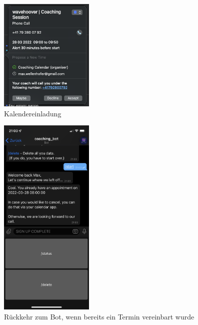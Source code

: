 	\begin{figure}
		\centering
		\includegraphics[width=0.4\textwidth]{images/Screenshots/calendar-invite.png}
		\caption{Kalendereinladung}
		\label{fig: scs..calendar-invite}
	\end{figure}


	\begin{figure}
		\centering
		\includegraphics[width=0.4\textwidth]{images/Screenshots/return-with-appointment.PNG}
		\caption{Rückkehr zum Bot, wenn bereits ein Termin vereinbart wurde}
		\label{fig: scs..return-with-appointment}
	\end{figure}


